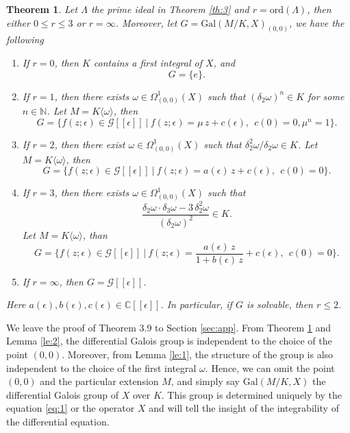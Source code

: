\documentclass[preprint, 12pt]{elsarticle}
\newtheorem{thm}{Theorem}[section]
\numberwithin{equation}{section}
\newcommand{\Comp}{\mathbb{C}}
\newcommand{\G}{\mathcal{G}}
\newcommand{\Gal}{\mathrm{Gal}}
\begin{document}
\begin{thm}
\label{th:8} Let $\Lambda$ the
prime ideal in Theorem \ref{th:3} and $r = \mathrm{ord}(\Lambda)$, then either $0\leq r\leq 3$ or
$r = \infty$. Moreover, let $G = \Gal(M/K,X)_{(0,0)}$, we have the following
\begin{enumerate}
\item[(1).] If $r = 0$, then $K$ contains a first integral of $X$, and
\begin{equation}
\label{eq:16}G = \{e\}.
\end{equation} 
\item[(2).] If
$r = 1$, then there exists $\omega\in\Omega_{(0,0)}^1(X)$ such
that $(\delta_2\omega)^n\in K$ for some $n\in \mathbb{N}$. Let $M
= K\langle\omega\rangle$, then
\begin{equation}
\label{eq:12} G = \{f(z;\epsilon)\in
\G[[\epsilon]]\ \Big|\ f(z;\epsilon) = \mu\,z + c(\epsilon),\ \
c(0) = 0, \mu^n = 1\}.
\end{equation} 
\item[(3).] If $r = 2$, then there exist $\omega\in
\Omega_{(0,0)}^1(X)$ such that $\delta_2^2 \omega /\delta_2
\omega\in K$. Let $M = K\langle\omega\rangle$, then
\begin{equation}
\label{eq:13} G =
\{f(z;\epsilon)\in\G[[\epsilon]]\ \Big|\ f(z;\epsilon) =
a(\epsilon)\,z + c(\epsilon),\ \ c(0) = 0\}.
\end{equation}
\item[(4).] If $r = 3$, then there exists $\omega\in
\Omega_{(0,0)}^1(X)$ such that
$$\dfrac{\delta_2 \omega\cdot\delta_3\omega - 3\,\delta_2^2\omega}{(\delta_2 \omega)^2}\in K.$$
Let $M = K\langle\omega\rangle$, than
\begin{equation}
\label{eq:14} G =
\{f(z;\epsilon)\in\G[[\epsilon]]\ \Big|\ f(z;\epsilon) =
\frac{a(\epsilon)\,z}{1 + b(\epsilon)\,z} + c(\epsilon),\ \ c(0) =
0\}.
\end{equation}
\item[(5).] If $r = \infty$, then $G =
\G[[\epsilon]]$.
\end{enumerate}
Here $a(\epsilon), b(\epsilon), c(\epsilon)\in \Comp[[\epsilon]]$. In particular, if $G$ is solvable, then $r\leq 2$.
\end{thm}
We leave the proof of Theorem 3.9 to Section \ref{sec:app}. From Theorem
\ref{th:8} and Lemma \ref{le:2}, the differential Galois group is
independent to the choice of the point $(0,0)$. Moreover, from
Lemma \ref{le:1}, the structure of the group is also independent to the
choice of the first integral $\omega$. Hence, we can omit the
point $(0,0)$ and the particular extension $M$, and simply say $\Gal(M/K,X)$ the differential Galois group of $X$ over $K$. This group is determined uniquely by the equation \eqref{eq:1} or the operator $X$ and will tell the insight of the integrability of the differential equation.
\end{document}
